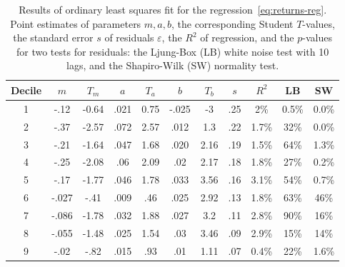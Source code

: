 \documentclass[12pt]{amsart}
\begin{document}
\begin{table}
\begin{tabular}{|c|c|c|c|c|c|c|c|c|c|c|}
\hline
Decile & $m$ & $T_{m}$ & $a$ & $T_a$ & $b$ & $T_b$ & $s$ & $R^2$ & LB & SW\\
\hline
1 & -.12 & -0.64 & .021 & 0.75 & -.025 & -3 & .25 & 2\% & 0.5\% & 0.0\%\\
\hline
2 & -.37 & -2.57 & .072 & 2.57 & .012 & 1.3 & .22 & 1.7\% & 32\% & 0.0\%\\
\hline
3 & -.21 & -1.64 & .047 & 1.68 & .020 & 2.16 & .19 & 1.5\% & 64\% & 1.3\%\\
\hline
4 & -.25 & -2.08 & .06 & 2.09 & .02 & 2.17 & .18 & 1.8\% & 27\% & 0.2\%\\
\hline
5 & -.17 & -1.77 & .046 & 1.78 & .033 & 3.56 & .16 & 3.1\% & 54\% & 0.7\%\\
\hline
6 & -.027 & -.41 & .009 & .46 & .025 & 2.92 & .13 & 1.8\% & 63\% & 46\%\\
\hline
7 & -.086 & -1.78 & .032 & 1.88 &  .027 & 3.2 & .11 & 2.8\% & 90\% & 16\%\\
\hline
8 & -.055 & -1.48 & .025 & 1.54 & .03 & 3.46 & .09 & 2.9\% & 15\% & 14\%\\
\hline
9 & -.02 & -.82 & .015 & .93 & .01 & 1.11 & .07 & 0.4\% & 22\% & 1.6\%\\
\hline
\end{tabular}
\bigskip
\caption{Results of ordinary least squares fit for the regression~\eqref{eq:returns-reg}. Point estimates of parameters $m, a, b$, the corresponding Student $T$-values, the standard error $s$ of residuals $\varepsilon$, the $R^2$ of regression, and the $p$-values for two tests for residuals: the Ljung-Box (LB) white noise test with 10 lags, and the Shapiro-Wilk (SW) normality test.}
\label{table:return}
\end{table}
\end{document}

